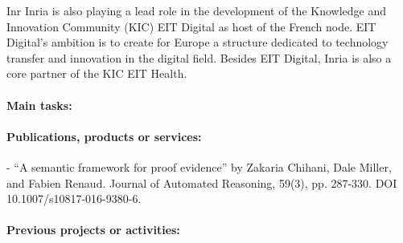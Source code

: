 \begin{sitedescription}{Inr}
Inria is also playing a lead role in the development of the Knowledge and Innovation Community (KIC) EIT Digital as host of the French node. EIT Digital’s ambition is to create for Europe a structure dedicated to technology transfer and innovation in the digital field. Besides EIT Digital, Inria is also a core partner of the KIC EIT Health.

\paragraph{Main tasks:}


\begin{compactitem}
\item{}
\end{compactitem}

\paragraph{Publications, products or services:}




- ``A semantic framework for proof evidence'' by Zakaria Chihani, Dale
  Miller, and Fabien Renaud. Journal of Automated Reasoning, 59(3),
  pp. 287-330.  DOI 10.1007/s10817-016-9380-6.

\paragraph{Previous projects or activities:}





\end{sitedescription}
